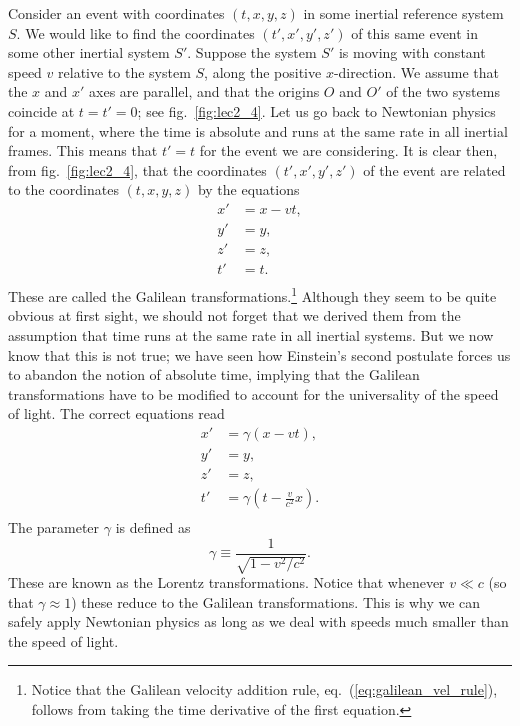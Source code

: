 \documentclass[11pt, a4paper,oneside,openright]{book}
\numberwithin{equation}{section}
\begin{document}
Consider an event with coordinates $(t,x,y,z)$ in some inertial reference system $S$. We would like to find the coordinates $(t',x',y',z')$ of this same event in some other inertial system $S'$. Suppose the system $S'$ is moving with constant speed $v$ relative to the system $S$, along the positive $x$-direction. We assume that the $x$ and $x'$ axes are parallel, and that the origins $O$ and $O'$ of the two systems coincide at $t=t'=0$; see fig.\ \ref{fig:lec2_4}. Let us go back to Newtonian physics for a moment, where the time is absolute and runs at the same rate in all inertial frames. This means that $t'=t$ for the event we are considering. It is clear then, from fig.\ \ref{fig:lec2_4}, that the coordinates $(t',x',y',z')$ of the event are related to the coordinates $(t,x,y,z)$ by the equations
\begin{equation}
\begin{split}
x'&=x-vt,\\
y'&=y,\\
z'&=z,\\
t'&=t.\\
\end{split}
\end{equation}
These are called the Galilean transformations.\footnote{Notice that the Galilean velocity addition rule, eq.\ (\ref{eq:galilean_vel_rule}), follows from taking the time derivative of the first equation.} Although they seem to be quite obvious at first sight, we should not forget that we derived them from the assumption that time runs at the same rate in all inertial systems. But we now know that this is not true; we have seen how Einstein's second postulate forces us to abandon the notion of absolute time, implying that the Galilean transformations have to be modified to account for the universality of the speed of light. The correct equations read
\begin{equation} \label{eq:lorentz_transf}
\begin{split}
x'&=\gamma\left(x-vt\right),\\
y'&=y,\\
z'&=z,\\
t'&=\gamma\left(t-\frac{v}{c^2}x\right).\\
\end{split}
\end{equation}
The parameter $\gamma$ is defined as
\begin{equation}
\gamma\equiv\frac{1}{\sqrt{1-v^2/c^2}}.
\end{equation}
These are known as the Lorentz transformations. Notice that whenever $v\ll c$ (so that $\gamma\approx1$) these reduce to the Galilean transformations. This is why we can safely apply Newtonian physics as long as we deal with speeds much smaller than the speed of light.
\end{document}
